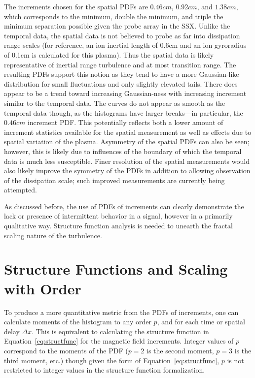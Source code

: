 \documentclass[preprint2]{aastex}
\begin{document}
The increments chosen for the spatial PDFs are $0.46cm$, $0.92cm$, and $1.38cm$, which corresponds to the minimum, double the minimum, and triple the minimum separation possible given the probe array in the SSX. Unlike the temporal data, the spatial data is not believed to probe as far into dissipation range scales (for reference, an ion inertial length of 0.6cm  and an ion gyroradius of 0.1cm is calculated for this plasma). Thus the spatial data is likely representative of inertial range turbulence and at most transition range. The resulting PDFs support this notion as they tend to have a more Gaussian-like distribution for small fluctuations and only slightly elevated tails. There does appear to be a trend toward increasing Gaussian-ness with increasing increment similar to the temporal data. The curves do not appear as smooth as the temporal data though, as the histograms have larger breaks---in particular, the $0.46cm$ increment PDF. This potentially reflects both a lower amount of increment statistics available for the spatial measurement as well as effects due to spatial variation of the plasma. Asymmetry of the spatial PDFs can also be seen; however, this is likely due to influences of the boundary of which the temporal data is much less susceptible. Finer resolution of the spatial measurements would also likely improve the symmetry of the PDFs in addition to allowing observation of the dissipation scale; such improved measurements are currently being attempted.

As discussed before, the use of PDFs of increments can clearly demonstrate the lack or presence of intermittent behavior in a signal, however in a primarily qualitative way. Structure function analysis is needed to unearth the fractal scaling nature of the turbulence.

\section{Structure Functions and Scaling with Order}\label{sec:structs}

To produce a more quantitative metric from the PDFs of increments, one can calculate moments of the histogram to any order $p$, and for each time or spatial delay $\Delta x$. This is equivalent to calculating the structure function in Equation~\ref{eq:structfunc} for the magnetic field increments. Integer values of $p$ correspond to the moments of the PDF ($p=2$ is the second moment, $p=3$ is the third moment, etc.) though given the form of Equation~\ref{eq:structfunc}, $p$ is not restricted to integer values in the structure function formalization.
\end{document}
